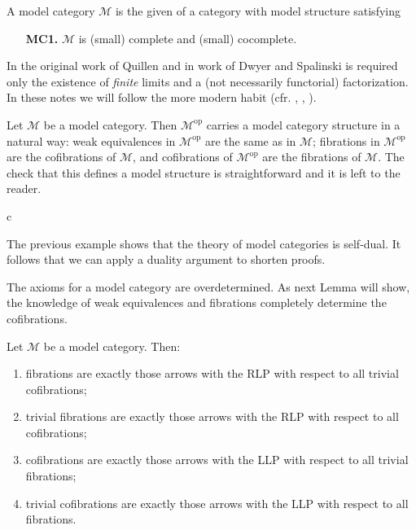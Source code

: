 \begin{defin}
A model category $\mathcal M$ is the given of a category with model structure satisfying
\begin{itemize}[leftmargin = 1.4 cm]
\item[{\bfseries MC1.}] $\mathcal M$ is (small) complete and (small) cocomplete.
\end{itemize}
\end{defin}

\begin{rmk}
In the original work of Quillen \cite{quillen} and in work of Dwyer and Spalinski \cite{dwsp} is required only the existence of \emph{finite} limits and a (not necessarily functorial) factorization. In these notes we will follow the more modern habit (cfr. \cite{hovey}, \cite{hirschhorn}, \cite{dhk}).
\end{rmk}

\begin{eg}
Let $\mathcal M$ be a model category. Then $\mathcal M^\mathrm{op}$ carries a model category structure in a natural way: weak equivalences in $\mathcal M^\mathrm{op}$ are the same as in $\mathcal M$; fibrations in $\mathcal M^\mathrm{op}$ are the cofibrations of $\mathcal M$, and cofibrations of $\mathcal M^\mathrm{op}$ are the fibrations of $\mathcal M$. The check that this defines a model structure is straightforward and it is left to the reader.
\end{eg}

\begin{eg} \label{eg model structure overcategories}
c %
\end{eg}

\begin{rmk}
The previous example shows that the theory of model categories is self-dual. It follows that we can apply a duality argument to shorten proofs.
\end{rmk}

\begin{rmk}
The axioms for a model category are overdetermined. As next Lemma will show, the knowledge of weak equivalences and fibrations completely determine the cofibrations.
\end{rmk}

\begin{lemma}
Let $\mathcal M$ be a model category. Then:
\begin{enumerate}
\item fibrations are exactly those arrows with the RLP with respect to all trivial cofibrations;
\item trivial fibrations are exactly those arrows with the RLP with respect to all cofibrations;
\item cofibrations are exactly those arrows with the LLP with respect to all trivial fibrations;
\item trivial cofibrations are exactly those arrows with the LLP with respect to all fibrations.
\end{enumerate}
\end{lemma}

